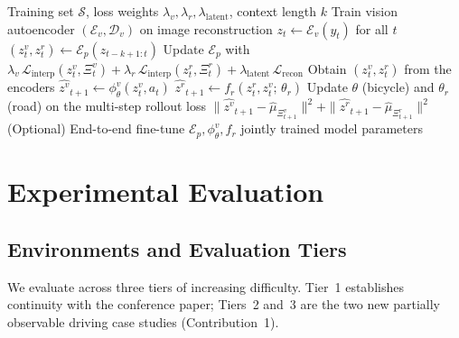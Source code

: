 \documentclass[preprint,12pt]{elsarticle}
\newcommand{\zv}{z^{v}}      %
\newcommand{\zr}{z^{r}}      %
\begin{document}
\begin{algorithm}[t]
\caption{PIWM training for partially observable driving.}
\label{alg:piwm_drive}
\begin{algorithmic}[1]
\Require Training set $\mathcal{S}$, loss weights
         $\lambda_v, \lambda_r, \lambda_{\mathrm{latent}}$, context length $k$
\State Train vision autoencoder $(\mathcal{E}_v, \mathcal{D}_v)$ on image
       reconstruction
    \State $z_t \gets \mathcal{E}_v(y_t)$ for all $t$
    \State $(\zv_t, \zr_t) \gets \mathcal{E}_p(z_{t-k+1:t})$
    \State Update $\mathcal{E}_p$ with
           $\lambda_v\,\mathcal{L}_{\mathrm{interp}}(\zv_t, \Xi^v_t)
           + \lambda_r\,\mathcal{L}_{\mathrm{interp}}(\zr_t, \Xi^r_t)
           + \lambda_{\mathrm{latent}}\,\mathcal{L}_{\mathrm{recon}}$
\EndFor
{}
    \State Obtain $(\zv_t, \zr_t)$ from the encoders
    \State $\hat{\zv}_{t+1} \gets \phi^{v}_\theta(\zv_t, a_t)$
    \State $\hat{\zr}_{t+1} \gets f_r(\zr_t, \zv_t;\,\theta_r)$
    \State Update $\theta$ (bicycle) and $\theta_r$ (road) on the multi-step
           rollout loss
           $\|\hat{\zv}_{t+1} - \hat{\mu}_{\Xi^v_{t+1}}\|^2
           + \|\hat{\zr}_{t+1} - \hat{\mu}_{\Xi^r_{t+1}}\|^2$
\EndFor
\State (Optional) End-to-end fine-tune $\mathcal{E}_p, \phi^{v}_\theta, f_r$ jointly
\State \Return trained model parameters
\end{algorithmic}
\end{algorithm}


\section{Experimental Evaluation}\label{sec:experiments}

\subsection{Environments and Evaluation Tiers}

We evaluate across three tiers of increasing difficulty.
Tier~1 establishes continuity with the conference paper; Tiers~2 and~3 are the two
new partially observable driving case studies (Contribution~1).
\end{document}
